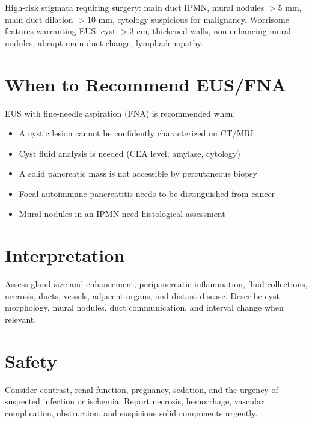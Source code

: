\begin{pearlbox}
High-risk stigmata requiring surgery: main duct IPMN, mural nodules $> 5$ mm, main duct dilation $> 10$ mm, cytology suspicious for malignancy. Worrisome features warranting EUS: cyst $> 3$ cm, thickened walls, non-enhancing mural nodules, abrupt main duct change, lymphadenopathy.
\end{pearlbox}


\section{When to Recommend EUS/FNA}
EUS with fine-needle aspiration (FNA) is recommended when:
\begin{itemize}
  \item A cystic lesion cannot be confidently characterized on CT/MRI
  \item Cyst fluid analysis is needed (CEA level, amylase, cytology)
  \item A solid pancreatic mass is not accessible by percutaneous biopsy
  \item Focal autoimmune pancreatitis needs to be distinguished from cancer
  \item Mural nodules in an IPMN need histological assessment
\end{itemize}


\section{Interpretation}
Assess gland size and enhancement, peripancreatic inflammation, fluid collections, necrosis, ducts, vessels, adjacent organs, and distant disease. Describe cyst morphology, mural nodules, duct communication, and interval change when relevant.

\section{Safety}
Consider contrast, renal function, pregnancy, sedation, and the urgency of suspected infection or ischemia. Report necrosis, hemorrhage, vascular complication, obstruction, and suspicious solid components urgently.

\clearpage
